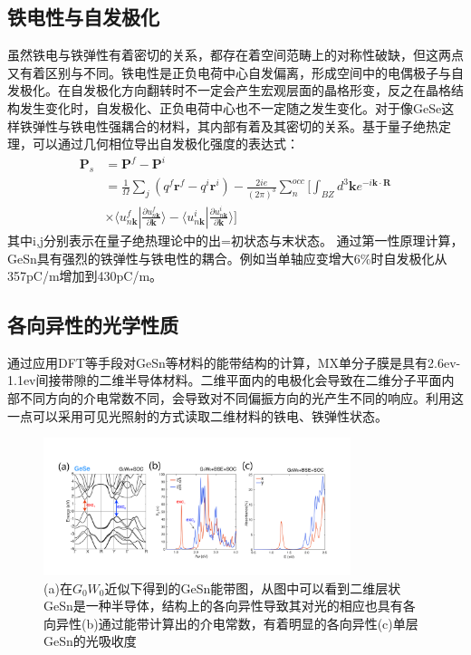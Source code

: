 \subsection{铁电性与自发极化}
虽然铁电与铁弹性有着密切的关系，都存在着空间范畴上的对称性破缺，但这两点又有着区别与不同。铁电性是正负电荷中心自发偏离，形成空间中的电偶极子与自发极化。在自发极化方向翻转时不一定会产生宏观层面的晶格形变，反之在晶格结构发生变化时，自发极化、正负电荷中心也不一定随之发生变化。对于像GeSe这样铁弹性与铁电性强耦合的材料，其内部有着及其密切的关系。基于量子绝热定理，可以通过几何相位导出自发极化强度的表达式：
\begin{equation}
    \begin{split}
        \bm{P}_{s}&=\bm{P}^{f}-\bm{P}^{i}\\
        &=\frac{1}{\Omega}\sum_{j}(q^{f}\bm{r}^{f}-q^{i}\bm{r}^{i})-\frac{2ie}{(2\pi)^{3}}\sum_{n}^{occ} [ \int_{BZ}d^{3} \bm{k} e^{-i\bm{k \cdot R}} \\
        & \times \langle u^{f}_{n \bm{k}} | \frac{\partial u_{n \bm{k}}^{f}}{\partial \bm{k}} \rangle - \langle u^{i}_{n \bm{k}} | \frac{\partial u^{i}_{n \bm{k}}}{\partial \bm{k}} \rangle ]
    \end{split}
    \label{eq:}
\end{equation}
其中i,j分别表示在量子绝热理论中的出=初状态与末状态。
通过第一性原理计算，GeSn具有强烈的铁弹性与铁电性的耦合。例如当单轴应变增大6\%时自发极化从357pC/m增加到430pC/m。

\subsection{各向异性的光学性质}

通过应用DFT等手段对GeSn等材料的能带结构的计算，MX单分子膜是具有2.6ev-1.1ev间接带隙的二维半导体材料。二维平面内的电极化会导致在二维分子平面内部不同方向的介电常数不同，会导致对不同偏振方向的光产生不同的响应。利用这一点可以采用可见光照射的方式读取二维材料的铁电、铁弹性状态。
\begin{figure}[h]
    \centering
\includegraphics[width=0.8\textwidth]{./pic/019.png}
\caption{(a)在$G_{0}W_{0}$近似下得到的GeSn能带图，从图中可以看到二维层状GeSn是一种半导体，结构上的各向异性导致其对光的相应也具有各向异性(b)通过能带计算出的介电常数，有着明显的各向异性(c)单层GeSn的光吸收度}

\label{dog019}
\end{figure}

